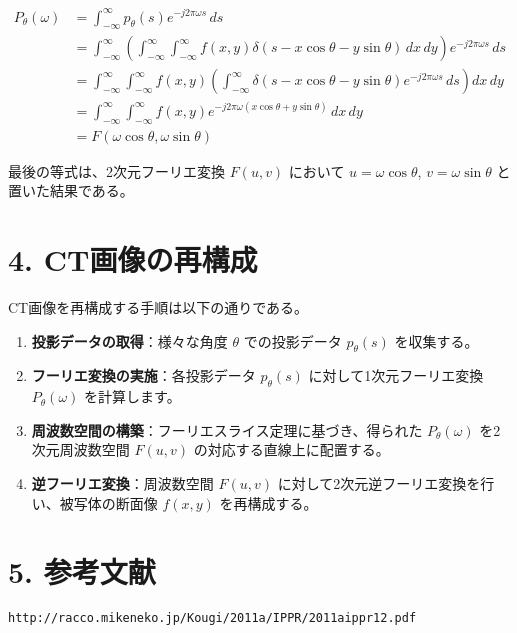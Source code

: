 \documentclass[uplatex]{jsarticle}
\begin{document}
\begin{align*}
P_\theta(\omega) &= \int_{-\infty}^{\infty} p_\theta(s) e^{-j2\pi \omega s} \, ds \\
&= \int_{-\infty}^{\infty} \left( \int_{-\infty}^{\infty} \int_{-\infty}^{\infty} f(x, y) \delta(s - x\cos\theta - y\sin\theta) \, dx \, dy \right) e^{-j2\pi \omega s} \, ds \\
&= \int_{-\infty}^{\infty} \int_{-\infty}^{\infty} f(x, y) \left( \int_{-\infty}^{\infty} \delta(s - x\cos\theta - y\sin\theta) e^{-j2\pi \omega s} \, ds \right) dx \, dy \\
&= \int_{-\infty}^{\infty} \int_{-\infty}^{\infty} f(x, y) e^{-j2\pi \omega (x\cos\theta + y\sin\theta)} \, dx \, dy \\
&= F(\omega \cos\theta, \omega \sin\theta)
\end{align*}

最後の等式は、2次元フーリエ変換 $F(u, v)$ において $u = \omega \cos\theta$, $v = \omega \sin\theta$ と置いた結果である。

\section*{4. CT画像の再構成}

CT画像を再構成する手順は以下の通りである。

\begin{enumerate}
    \item \textbf{投影データの取得}：様々な角度 $\theta$ での投影データ $p_\theta(s)$ を収集する。
    \item \textbf{フーリエ変換の実施}：各投影データ $p_\theta(s)$ に対して1次元フーリエ変換 $P_\theta(\omega)$ を計算します。
    \item \textbf{周波数空間の構築}：フーリエスライス定理に基づき、得られた $P_\theta(\omega)$ を2次元周波数空間 $F(u, v)$ の対応する直線上に配置する。
    \item \textbf{逆フーリエ変換}：周波数空間 $F(u, v)$ に対して2次元逆フーリエ変換を行い、被写体の断面像 $f(x, y)$ を再構成する。
\end{enumerate}

\section*{5. 参考文献}
\verb|http://racco.mikeneko.jp/Kougi/2011a/IPPR/2011aippr12.pdf|
\end{document}
